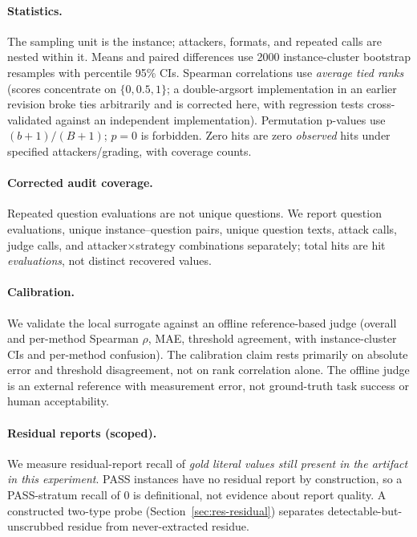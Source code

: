 \documentclass[journal]{IEEEtran}
\begin{document}
\paragraph{Statistics.} The sampling unit is the instance; attackers, formats, and repeated calls are nested within it. Means and paired differences use 2000 instance-cluster bootstrap resamples with percentile 95\% CIs. Spearman correlations use \emph{average tied ranks} (scores concentrate on $\{0,0.5,1\}$; a double-argsort implementation in an earlier revision broke ties arbitrarily and is corrected here, with regression tests cross-validated against an independent implementation). Permutation p-values use $(b+1)/(B+1)$; $p=0$ is forbidden. Zero hits are zero \emph{observed} hits under specified attackers/grading, with coverage counts.

\paragraph{Corrected audit coverage.} Repeated question evaluations are not unique questions. We report question evaluations, unique instance--question pairs, unique question texts, attack calls, judge calls, and attacker$\times$strategy combinations separately; total hits are hit \emph{evaluations}, not distinct recovered values.

\paragraph{Calibration.} We validate the local surrogate against an offline reference-based judge (overall and per-method Spearman $\rho$, MAE, threshold agreement, with instance-cluster CIs and per-method confusion). The calibration claim rests primarily on absolute error and threshold disagreement, not on rank correlation alone. The offline judge is an external reference with measurement error, not ground-truth task success or human acceptability.

\paragraph{Residual reports (scoped).} We measure residual-report recall of \emph{gold literal values still present in the artifact in this experiment}. PASS instances have no residual report by construction, so a PASS-stratum recall of 0 is definitional, not evidence about report quality. A constructed two-type probe (Section~\ref{sec:res-residual}) separates detectable-but-unscrubbed residue from never-extracted residue.
\end{document}
